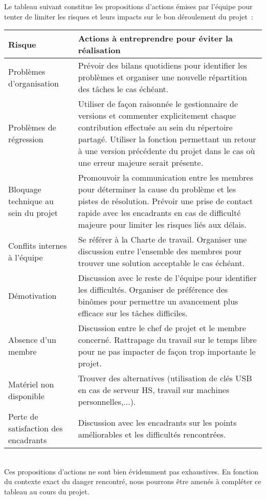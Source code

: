 \documentclass[a4paper,11pt]{article}
\begin{document}
Le tableau suivant constitue les propositions d'actions émises par l'équipe pour tenter de limiter les risques et leurs impacts sur le bon déroulement du projet~: \\

\begin{tabular}{|p{5cm}||p{12cm}|}
\hline  
   Risque & Actions à entreprendre pour éviter la réalisation \\
\hline
\hline
   Problèmes d'organisation & Prévoir des bilans quotidiens pour 
identifier les problèmes et organiser une nouvelle répartition des tâches le cas échéant. \\
\hline
   Problèmes de régression & Utiliser de façon raisonnée le gestionnaire de versions et 
commenter explicitement chaque contribution effectuée au sein du répertoire partagé. Utiliser la fonction permettant un retour à une version précédente du projet dans le cas où une erreur majeure serait présente.\\
\hline
Bloquage technique au sein du projet & Promouvoir la communication entre les membres pour déterminer la cause du problème et les pistes de résolution. Prévoir une prise de contact rapide avec les encadrants en cas de difficulté majeure pour limiter les risques liés aux délais.\\
\hline
   Conflits internes à l'équipe & Se référer à la Charte de travail. Organiser une discussion entre l'ensemble des membres pour trouver une solution acceptable le cas échéant.\\
\hline
   Démotivation & Discussion avec le reste de l'équipe pour identifier les difficultés. Organiser de préférence des binômes pour permettre un avancement plus efficace sur les tâches difficiles.\\
\hline
   Absence d'un membre & Discussion entre le chef de projet et le membre concerné. Rattrapage du travail sur le temps libre pour ne pas impacter de façon trop importante le projet.\\
\hline
   Matériel non disponible & Trouver des alternatives (utilisation de clés USB en cas de serveur HS, travail sur machines personnelles,...).\\   
\hline
   Perte de satisfaction des encadrants & Discussion avec les encadrants sur les points améliorables et les difficultés rencontrées.\\ 

\hline
\end{tabular}\\

Ces propositions d'actions ne sont bien évidemment pas exhaustives. En fonction du contexte exact du danger rencontré, nous pourrons être amenés à compléter ce tableau au cours du projet.\\
\end{document}
